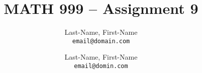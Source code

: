 \newcommand{\preamblefolder}{./include}       %

\usepackage[enable]{easy-todo} %




\title{MATH 999 -- Assignment 9}
\author{
  Last-Name, First-Name\\
  \texttt{email@domain.com}\\
 \and
 Last-Name, First-Name\\
 \texttt{email@domin.com}
}



  \maketitle

